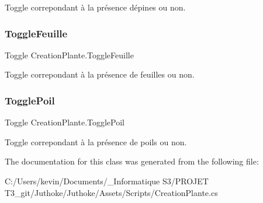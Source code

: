 Toggle correpondant à la présence d\textquotesingle{}épines ou non. \mbox{\label{class_creation_plante_a921a3d594a984a3d101245fc05a16cf8}} 
\subsubsection{\texorpdfstring{Toggle\+Feuille}{ToggleFeuille}}
{\footnotesize\ttfamily Toggle Creation\+Plante.\+Toggle\+Feuille}

Toggle correpondant à la présence de feuilles ou non. \mbox{\label{class_creation_plante_abf832f4a1aaf950d8dd40ed77492eb26}} 
\subsubsection{\texorpdfstring{Toggle\+Poil}{TogglePoil}}
{\footnotesize\ttfamily Toggle Creation\+Plante.\+Toggle\+Poil}

Toggle correpondant à la présence de poils ou non. 

The documentation for this class was generated from the following file\+:\begin{DoxyCompactItemize}
\item 
C\+:/\+Users/kevin/\+Documents/\+\_\+\+Informatique S3/\+P\+R\+O\+J\+E\+T T3\+\_\+git/\+Juthoke/\+Juthoke/\+Assets/\+Scripts/Creation\+Plante.\+cs\end{DoxyCompactItemize}
